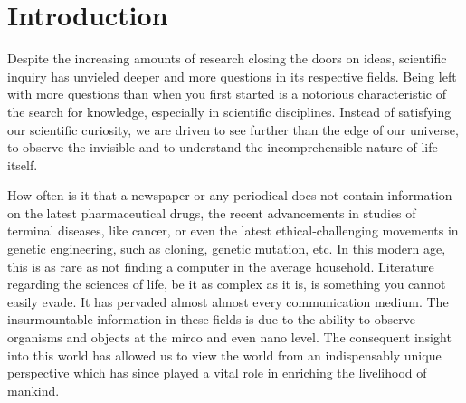 
\chapter{Introduction} %

\label{chap:Chapter1} %


Despite the increasing amounts of research closing the doors on ideas, scientific inquiry has unvieled deeper and more questions in its respective fields. 
Being left with more questions than when you first started is a notorious characteristic of the search for knowledge, especially in scientific disciplines. 
Instead of satisfying our scientific curiosity, we are driven to see further than the edge of our universe, to observe the invisible and to understand the incomprehensible nature of life itself.

How often is it that a newspaper or any periodical does not contain information on the latest pharmaceutical drugs, the recent advancements in studies of terminal diseases, like cancer, or even the latest ethical-challenging movements in genetic engineering, such as cloning, genetic mutation, etc. 
In this modern age, this is as rare as not finding a computer in the average household. 
Literature regarding the sciences of life, be it as complex as it is, is something you cannot easily evade. 
It has pervaded almost almost every communication medium. 
The insurmountable information in these fields is due to the ability to observe organisms and objects at the mirco and even nano level. 
The consequent insight into this world has allowed us to view the world from an indispensably unique 
perspective which has since played a vital role in enriching the livelihood of mankind. 

